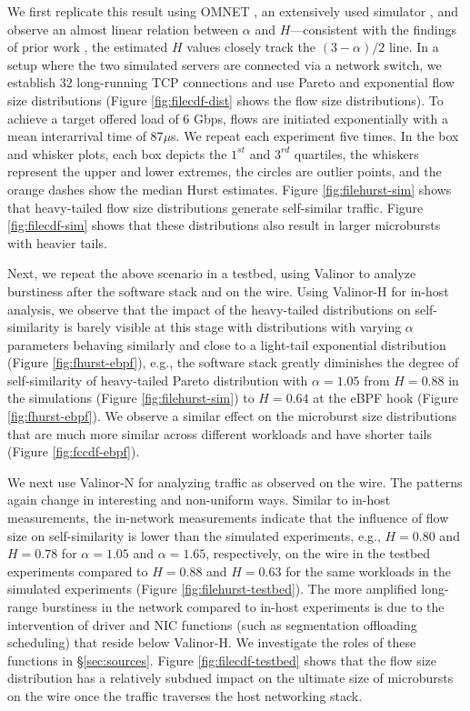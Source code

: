 We first replicate this result using OMNET \cite{omnet}, an extensively used simulator \cite{homa,conga,fatpaths}, and observe an almost linear relation between $\alpha$ and $H$---consistent with the findings of prior work \cite{filesize}, the estimated $H$ values closely track the $(3-\alpha)/2$ line. In a setup where the two simulated servers are connected via a network switch, we establish 32 long-running TCP connections and use Pareto and exponential flow size distributions (Figure \ref{fig:filecdf-dist} shows the flow size distributions). To achieve a target offered load of 6 Gbps, flows are initiated exponentially with a mean interarrival time of 87$\mu$s. We repeat each experiment five times. In the box and whisker plots, each box depicts the $1^{st}$ and $3^{rd}$ quartiles, the whiskers represent the upper and lower extremes, the circles are outlier points, and the orange dashes show the median Hurst estimates. Figure \ref{fig:filehurst-sim} shows that heavy-tailed flow size distributions generate self-similar traffic. Figure \ref{fig:filecdf-sim} shows that these distributions also result in larger microbursts with heavier tails.

Next, we repeat the above scenario in a testbed, using Valinor to analyze burstiness after the software stack and on the wire. Using Valinor-H for in-host analysis, we observe that the impact of the heavy-tailed distributions on self-similarity is barely visible at this stage with distributions with varying $\alpha$ parameters behaving similarly and close to a light-tail exponential distribution (Figure \ref{fig:fhurst-ebpf}), e.g., the software stack greatly diminishes the degree of self-similarity of heavy-tailed Pareto distribution with $\alpha=1.05$ from $H=0.88$ in the simulations (Figure \ref{fig:filehurst-sim}) to $H=0.64$ at the eBPF hook (Figure \ref{fig:fhurst-ebpf}). We observe a similar effect on the microburst size distributions that are much more similar across different workloads and have shorter tails (Figure \ref{fig:fccdf-ebpf}).

We next use Valinor-N for analyzing traffic as observed on the wire. The patterns again change in interesting and non-uniform ways. Similar to in-host measurements, the in-network measurements indicate that the influence of flow size on self-similarity is lower than the simulated experiments, e.g., $H=0.80$ and $H=0.78$ for $\alpha=1.05$ and $\alpha=1.65$, respectively, on the wire in the testbed experiments compared to $H=0.88$ and $H=0.63$ for the same workloads in the simulated experiments (Figure \ref{fig:filehurst-testbed}). The more amplified long-range burstiness in the network compared to in-host experiments is due to the intervention of driver and NIC functions (such as segmentation offloading scheduling) that reside below Valinor-H. We investigate the roles of these functions in \S\ref{sec:sources}. 
%
Figure \ref{fig:filecdf-testbed} shows that the flow size distribution has a relatively subdued impact on the ultimate size of microbursts on the wire once the traffic traverses the host networking stack.

